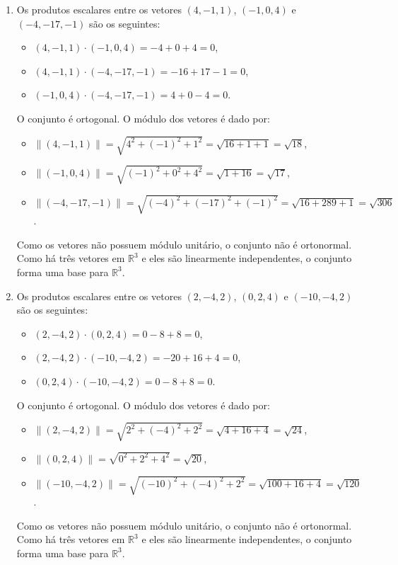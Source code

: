 \begin{resolution}
\begin{enumerate}[label=\alph*)]
    \item Os produtos escalares entre os vetores \((4, -1, 1)\), \((-1, 0, 4)\) e \((-4, -17, -1)\) são os seguintes:
          \begin{itemize}
            \item \((4, -1, 1) \cdot (-1, 0, 4) = -4 + 0 + 4 = 0\),
            \item \((4, -1, 1) \cdot (-4, -17, -1) = -16 + 17 - 1 = 0\),
            \item \((-1, 0, 4) \cdot (-4, -17, -1) = 4 + 0 - 4 = 0\).
          \end{itemize}
          O conjunto é ortogonal. O módulo dos vetores é dado por:
          \begin{itemize}
            \item \(\|(4, -1, 1)\| = \sqrt{4^2 + (-1)^2 + 1^2} = \sqrt{16 + 1 + 1} = \sqrt{18}\),
            \item \(\|(-1, 0, 4)\| = \sqrt{(-1)^2 + 0^2 + 4^2} = \sqrt{1 + 16} = \sqrt{17}\),
            \item \(\|(-4, -17, -1)\| = \sqrt{(-4)^2 + (-17)^2 + (-1)^2} = \sqrt{16 + 289 + 1} = \sqrt{306}\).
          \end{itemize}
          Como os vetores não possuem módulo unitário, o conjunto não é ortonormal.  Como há três vetores em \(\mathbb{R}^3\) e eles são linearmente independentes, o conjunto forma uma base para \(\mathbb{R}^3\).

    \item Os produtos escalares entre os vetores \((2, -4, 2)\), \((0, 2, 4)\) e \((-10, -4, 2)\) são os seguintes:
          \begin{itemize}
            \item \((2, -4, 2) \cdot (0, 2, 4) = 0 - 8 + 8 = 0\),
            \item \((2, -4, 2) \cdot (-10, -4, 2) = -20 + 16 + 4 = 0\),
            \item \((0, 2, 4) \cdot (-10, -4, 2) = 0 - 8 + 8 = 0\).
          \end{itemize}
          O conjunto é ortogonal. O módulo dos vetores é dado por:
          \begin{itemize}
            \item \(\|(2, -4, 2)\| = \sqrt{2^2 + (-4)^2 + 2^2} = \sqrt{4 + 16 + 4} = \sqrt{24}\),
            \item \(\|(0, 2, 4)\| = \sqrt{0^2 + 2^2 + 4^2} = \sqrt{20}\),
            \item \(\|(-10, -4, 2)\| = \sqrt{(-10)^2 + (-4)^2 + 2^2} = \sqrt{100 + 16 + 4} = \sqrt{120}\).
          \end{itemize}
          Como os vetores não possuem módulo unitário, o conjunto não é ortonormal. Como há três vetores em \(\mathbb{R}^3\) e eles são linearmente independentes, o conjunto forma uma base para \(\mathbb{R}^3\).


\end{enumerate}
\end{resolution}
